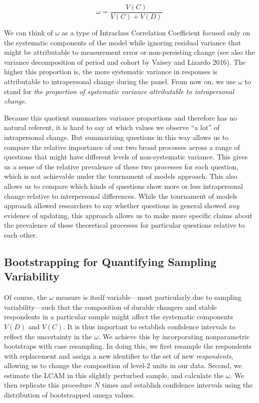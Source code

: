 \documentclass[
  11pt,
]{article}
\begin{document}
\[
\omega = \frac{V(C)}{V(C) + V(D)}
\]

We can think of \(\omega\) as a type of Intraclass Correlation
Coefficient focused only on the systematic components of the model while
ignoring residual variance that might be attributable to measurement
error or non-persisting change (see also the variance decomposition of
period and cohort by Vaisey and Lizardo 2016). The higher this
proportion is, the more systematic variance in responses is attributable
to intrapersonal change during the panel. From now on, we use \(\omega\)
to stand for \emph{the proportion of systematic variance attributable to
intrapersonal change}.

Because this quotient summarizes variance proportions and therefore has
no natural referent, it is hard to say at which values we observe ``a
lot'' of intrapersonal change. But summarizing questions in this way
allows us to compare the relative importance of our two broad processes
across a range of questions that might have different levels of
non-systematic variance. This gives us a sense of the relative
prevalence of these two processes for each question, which is not
achievable under the tournament of models approach. This also allows us
to compare which kinds of questions show more or less intrapersonal
change relative to interpersonal differences. While the tournament of
models approach allowed researchers to say whether questions in general
showed \emph{any} evidence of updating, this approach allows us to make
more specific claims about the prevalence of these theoretical processes
for particular questions relative to each other.

\subsection{Bootstrapping for Quantifying Sampling
Variability}\label{bootstrapping-for-quantifying-sampling-variability}

Of course, the \(\omega\) measure is itself variable---most particularly
due to sampling variability---such that the composition of durable
changers and stable respondents in a particular sample might affect the
systematic components \(V(D)\) and \(V(C)\). It is thus important to
establish confidence intervals to reflect the uncertainty in the
\(\omega\). We achieve this by incorporating nonparametric bootstraps
with case resampling. In doing this, we first resample the respondents
with replacement and assign a new identifier to the set of new
\emph{respondents}, allowing us to change the composition of level-2
units in our data. Second, we estimate the LCAM in this slightly
perturbed sample, and calculate the \(\omega\). We then replicate this
procedure \(N\) times and establish confidence intervals using the
distribution of bootstrapped omega values.
\end{document}
